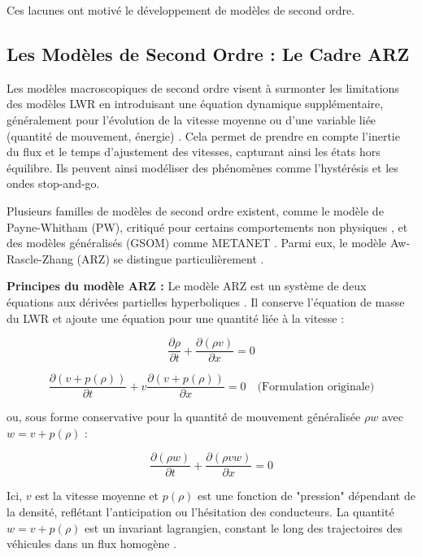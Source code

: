 Ces lacunes ont motivé le développement de modèles de second ordre.

\subsection{Les Modèles de Second Ordre : Le Cadre ARZ}
Les modèles macroscopiques de second ordre visent à surmonter les limitations des modèles LWR en introduisant une équation dynamique supplémentaire, généralement pour l'évolution de la vitesse moyenne ou d'une variable liée (quantité de mouvement, énergie) \cite{FanHertySeibold2014}. Cela permet de prendre en compte l'inertie du flux et le temps d'ajustement des vitesses, capturant ainsi les états hors équilibre. Ils peuvent ainsi modéliser des phénomènes comme l'hystérésis \cite{Laval2011Hysteresis} et les ondes stop-and-go.

Plusieurs familles de modèles de second ordre existent, comme le modèle de Payne-Whitham (PW), critiqué pour certains comportements non physiques \cite{TreiberN/ALecture7}, et des modèles généralisés (GSOM) comme METANET \cite{BiswasUddin2015Metanet}. Parmi eux, le modèle Aw-Rascle-Zhang (ARZ) se distingue particulièrement \cite{AwKlarMaterneRascle2000, Zhang2002}.

\textbf{Principes du modèle ARZ :} Le modèle ARZ est un système de deux équations aux dérivées partielles hyperboliques \cite{IPAMN/AMathIntroTraffic}. Il conserve l'équation de masse du LWR et ajoute une équation pour une quantité liée à la vitesse :

\begin{equation}
\frac{\partial \rho}{\partial t} + \frac{\partial (\rho v)}{\partial x} = 0
\end{equation}

\begin{equation}
\frac{\partial (v + p(\rho))}{\partial t} + v \frac{\partial (v + p(\rho))}{\partial x} = 0 \quad \text{(Formulation originale)}
\end{equation}

ou, sous forme conservative pour la quantité de mouvement généralisée $\rho w$ avec $w = v + p(\rho)$ :

\begin{equation}
\frac{\partial (\rho w)}{\partial t} + \frac{\partial (\rho v w)}{\partial x} = 0
\end{equation}

Ici, $v$ est la vitesse moyenne et $p(\rho)$ est une fonction de "pression" dépendant de la densité, reflétant l'anticipation ou l'hésitation des conducteurs. La quantité $w = v + p(\rho)$ est un invariant lagrangien, constant le long des trajectoires des véhicules dans un flux homogène \cite{FanHertySeibold2014}.

